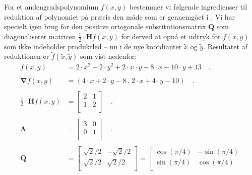 \begin{example}[Ellipse] \label{exampEllip01}
For et andengradspolynomium $f(x,y)$ bestemmer vi følgende ingredienser til reduktion af polynomiet på præcis den måde som er gennemgået i . Vi har specielt igen brug for den positive ortogonale substitutionsmatrix $\mathbf{Q}$ som diagonaliserer matricen $\frac{1}{2}\cdot \mathbf{H}f(x,y)$ for derved at opnå et udtryk for $f(x,y)$ som ikke indeholder produkt\-led -- nu i de nye koordianter $\widetilde{x}$ og $\widetilde{y}$. Resultatet af reduktionen er $\widetilde{f}(\widetilde{x}, \widetilde{y})$ som vist nedenfor:
\begin{equation}
\begin{aligned}
f(x,y) &= 2\cdot x^{2} + 2\cdot y^{2} + 2\cdot x\cdot y -8\cdot x -10 \cdot y + 13 \quad . \\  \\
\bm{\nabla}f(x,y) &= (4\cdot x +2\cdot y-8\, , \,2\cdot x + 4\cdot y -10) \quad . \\  \\
\frac{1}{2}\cdot \mathbf{H}f(x,y) &= \left[
                     \begin{array}{cc}
                       2 & 1 \\
                       1 & 2 \\
                     \end{array}
                   \right] \quad . \\ \\
\bm{\Lambda} &= \left[
                     \begin{array}{cc}
                       3 & 0 \\
                       0 & 1 \\
                     \end{array}
                   \right] \quad . \\ \\
\mathbf{Q} &= \left[
                     \begin{array}{cc}
                       \sqrt{2}/2 & -\sqrt{2}/2 \\
                       \sqrt{2}/2 & \sqrt{2}/2 \\
                     \end{array}
                   \right] = \left[
                     \begin{array}{cc}
                       \cos(\pi/4) & -\sin(\pi/4) \\
                        \sin(\pi/4) &  \cos(\pi/4)\\

\end{array}
\end{aligned}
\end{equation}
\end{example}
